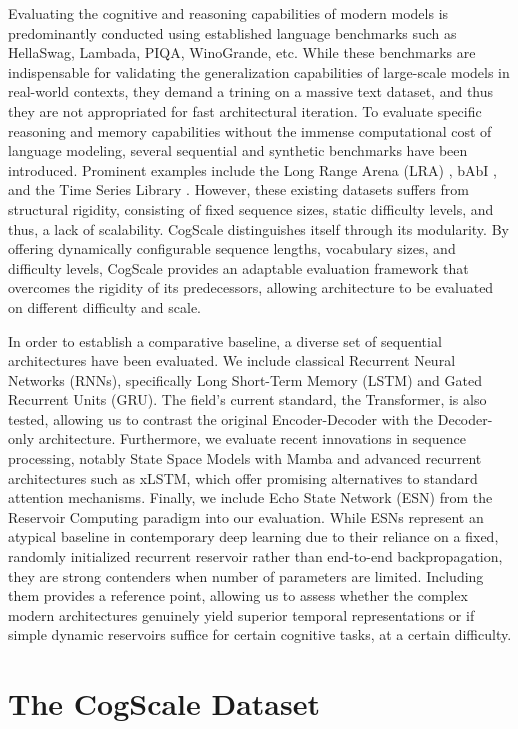 \documentclass{article}
\begin{document}
Evaluating the cognitive and reasoning capabilities of modern models is predominantly conducted using established language benchmarks such as HellaSwag, Lambada, PIQA, WinoGrande, etc. While these benchmarks are indispensable for validating the generalization capabilities of large-scale models in real-world contexts, they demand a trining on a massive text dataset, and thus they are not appropriated for fast architectural iteration. To evaluate specific reasoning and memory capabilities without the immense computational cost of language modeling, several sequential and synthetic benchmarks have been introduced. Prominent examples include the Long Range Arena (LRA) \cite{tay2020long}, bAbI \cite{weston2015towards}, and the Time Series Library \cite{wang2024tssurvey}. However, these existing datasets suffers from structural rigidity, consisting of fixed sequence sizes, static difficulty levels, and thus, a lack of scalability. CogScale distinguishes itself through its modularity. By offering dynamically configurable sequence lengths, vocabulary sizes, and difficulty levels, CogScale provides an  adaptable evaluation framework that overcomes the rigidity of its predecessors, allowing architecture to be evaluated on different difficulty and scale.

In order to establish a comparative baseline, a diverse set of sequential architectures have been evaluated. We include classical Recurrent Neural Networks (RNNs), specifically Long Short-Term Memory (LSTM) and Gated Recurrent Units (GRU). The field's current standard, the Transformer, is also tested, allowing us to contrast the original Encoder-Decoder with the Decoder-only architecture. Furthermore, we evaluate recent innovations in sequence processing, notably State Space Models with Mamba and advanced recurrent architectures such as xLSTM, which offer promising alternatives to standard attention mechanisms.
Finally, we include Echo State Network (ESN) from the Reservoir Computing paradigm into our evaluation. While ESNs represent an atypical baseline in contemporary deep learning due to their reliance on a fixed, randomly initialized recurrent reservoir rather than end-to-end backpropagation, they are strong contenders when number of parameters are limited. Including them provides a reference point, allowing us to assess whether the complex modern architectures genuinely yield superior temporal representations or if simple dynamic reservoirs suffice for certain cognitive tasks, at a certain difficulty.

\section{The CogScale Dataset}
\end{document}
